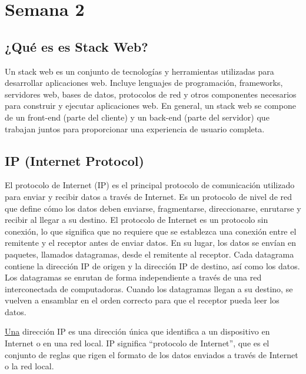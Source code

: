 \documentclass[../main.tex]{subfiles}
\begin{document}
\section{Semana 2} 
    \subsection{¿Qué es es Stack Web?}
        Un stack web es un conjunto de tecnologías y herramientas utilizadas para desarrollar aplicaciones web. Incluye lenguajes de programación, frameworks, servidores web, bases de datos, protocolos de red y otros componentes necesarios para construir y ejecutar aplicaciones web. En general, un stack web se compone de un front-end (parte del cliente) y un back-end (parte del servidor) que trabajan juntos para proporcionar una experiencia de usuario completa.

    \subsection{IP (Internet Protocol)}
        El protocolo de Internet (IP) es el principal protocolo de comunicación utilizado para enviar y recibir datos a través de Internet. Es un protocolo de nivel de red que define cómo los datos deben enviarse, fragmentarse, direccionarse, enrutarse y recibir al llegar a su destino. El protocolo de Internet es un protocolo sin conexión, lo que significa que no requiere que se establezca una conexión entre el remitente y el receptor antes de enviar datos. En su lugar, los datos se envían en paquetes, llamados datagramas, desde el remitente al receptor. Cada datagrama contiene la dirección IP de origen y la dirección IP de destino, así como los datos. Los datagramas se enrutan de forma independiente a través de una red interconectada de computadoras. Cuando los datagramas llegan a su destino, se vuelven a ensamblar en el orden correcto para que el receptor pueda leer los datos.

        \href{https://latam.kaspersky.com/resource-center/definitions/what-is-an-ip-address?awc=22032_1693228260_ffc9f8dd18251e1e1461fe7c8935b473&utm_source=awin&utm_medium=cpa&utm_campaign=3CelGtVNYfEUKYYs0I3OyxSVboGt7WXi7EYLlGCRwkZxfE&utm_term=101248}{Una} dirección IP es una dirección única que identifica a un dispositivo en Internet o en una red local. IP significa “protocolo de Internet”, que es el conjunto de reglas que rigen el formato de los datos enviados a través de Internet o la red local.
\end{document}
